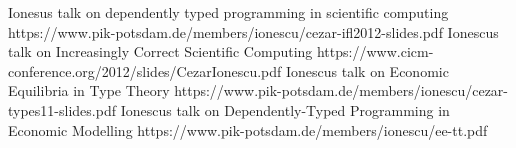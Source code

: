 
Ionesus talk on dependently typed programming in scientific computing
https://www.pik-potsdam.de/members/ionescu/cezar-ifl2012-slides.pdf
Ionescus talk on Increasingly Correct Scientific Computing
https://www.cicm-conference.org/2012/slides/CezarIonescu.pdf
Ionescus talk on Economic Equilibria in Type Theory
https://www.pik-potsdam.de/members/ionescu/cezar-types11-slides.pdf
Ionescus talk on Dependently-Typed Programming in Economic Modelling
https://www.pik-potsdam.de/members/ionescu/ee-tt.pdf